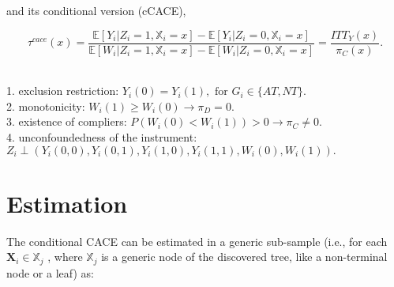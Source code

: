 and its conditional version (cCACE),

$$
\tau^{cace}(x) = \frac{\mathbb{E}[Y_i|Z_i=1, \mathbb{X}_i=x]-\mathbb{E}[Y_i|Z_i=0, \mathbb{X}_i=x]}{\mathbb{E}[W_i|Z_i=1, \mathbb{X}_i=x]-\mathbb{E}[W_i|Z_i=0, \mathbb{X}_i=x]} = \frac{ITT_Y(x)}{\pi_C(x)}. 
$$ 

\hspace{0.2cm}\\
1. exclusion restriction: $Y_i(0) = Y_i(1), \text{ for } G_i \in \{AT, NT \}.$ \\
2. monotonicity: $W_i(1) \geq W_i(0) \rightarrow \pi_D = 0.$ \\
3. existence of compliers: $P(W_i(0) < W_i(1)) > 0 \rightarrow \pi_C \ne 0.$ \\
4. unconfoundedness of the instrument: $Z_i \perp (Y_i(0, 0), Y_i(0, 1), Y_i(1, 0), Y_i(1, 1), W_i(0), W_i(1)).$


\section{Estimation}

The conditional CACE can be estimated in a generic sub-sample (i.e., for each $\mathbf{X}_i \in \mathbb{X}_j$ , where $\mathbb{X}_j$ is a
generic node of the discovered tree, like a non-terminal node or a leaf) as: